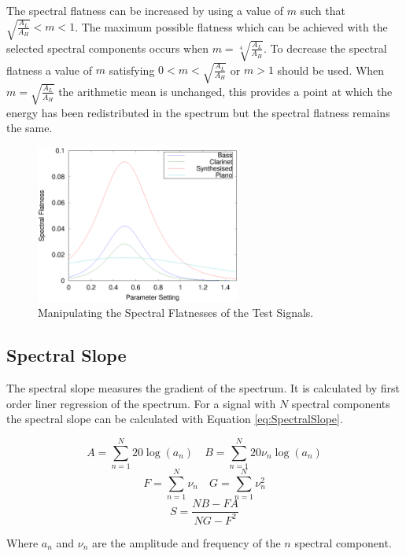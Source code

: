 		The spectral flatness can be increased by using a value of $m$ such that $\sqrt{\frac{A_{L}}{A_{H}}} < m <
		1$. The maximum possible flatness which can be achieved with the selected spectral components occurs when
		$m = \sqrt[4]{\frac{A_{L}}{A_{H}}}$. To decrease the spectral flatness a value of $m$ satisfying $0 <
		m < \sqrt{\frac{A_{L}}{A_{H}}}$ or $m > 1$ should be used. When $m = \sqrt{\frac{A_{L}}{A_{H}}}$ the
		arithmetic mean is unchanged, this provides a point at which the energy has been redistributed in the
		spectrum but the spectral flatness remains the same.

		\begin{figure}[h!]
			\centering
			\includegraphics[width=0.6\textwidth]{chapter6/Images/MoveFlatnesses.eps}
			\caption{Manipulating the Spectral Flatnesses of the Test Signals.}
			\label{fig:MoveFlatnesses}
		\end{figure}

	\subsection{Spectral Slope}
	\label{sec:FeatureControl-Parameterisation-Slope}
		The spectral slope measures the gradient of the spectrum. It is calculated by first order liner regression
		of the spectrum. For a signal with $N$ spectral components the spectral slope can be calculated with
		Equation \ref{eq:SpectralSlope}.

		\[ A = \sum_{n = 1}^{N} 20\log (a_{n}) \quad B = \sum_{n = 1}^{N} 20\nu_{n}\log (a_{n}) \]
		\[ F = \sum_{n = 1}^{N} \nu_{n} \quad G = \sum_{n = 1}^{N} \nu_{n}^{2} \]
		\begin{equation}
			S = \frac{NB - FA}
		                 {NG - F^{2}}
			\label{eq:SpectralSlope}
		\end{equation}

		Where $a_{n}$ and $\nu_{n}$ are the amplitude and frequency of the $n$ spectral component.

